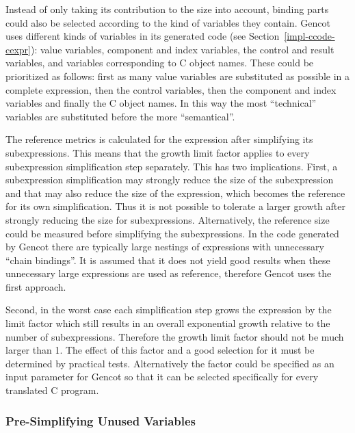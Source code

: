 Instead of only taking its contribution to the size into account, binding parts could also be selected according to the kind of
variables they contain. 
Gencot uses different kinds of variables in its generated code (see Section~\ref{impl-ccode-cexpr}): value variables, component and
index variables, the control and result variables, and variables corresponding to C object names. These could be prioritized
as follows: first as many value 
variables are substituted as possible in a complete expression, then the control variables, then the component and index variables and
finally the C object names. In this way the most ``technical'' variables are substituted before the more ``semantical''.

The reference metrics is calculated for the expression after simplifying its subexpressions. This means that the growth limit factor
applies to every subexpression simplification step separately. This has two implications. First, a subexpression simplification
may strongly reduce the size of the subexpression and that may also reduce the size of the  expression, which becomes 
the reference for its own simplification. Thus it is not possible to tolerate a larger growth after strongly reducing the size for
subexpressions. Alternatively, the reference size could be measured before simplifying the subexpressions. In the code generated
by Gencot there are typically large nestings of  expressions with unnecessary ``chain bindings''. It is assumed that it
does not yield good results when these unnecessary large expressions are used as reference, therefore Gencot uses the first approach.

Second, in the worst case each simplification step grows the expression by the limit factor which still results in an overall exponential growth
relative to the number of subexpressions. Therefore the growth limit factor should not be much larger than 1. The effect of this
factor and a good selection for it must be determined by practical tests. Alternatively the factor could be specified as an input 
parameter for Gencot so that it can be selected specifically for every translated C program.

\subsubsection{Pre-Simplifying Unused Variables}

